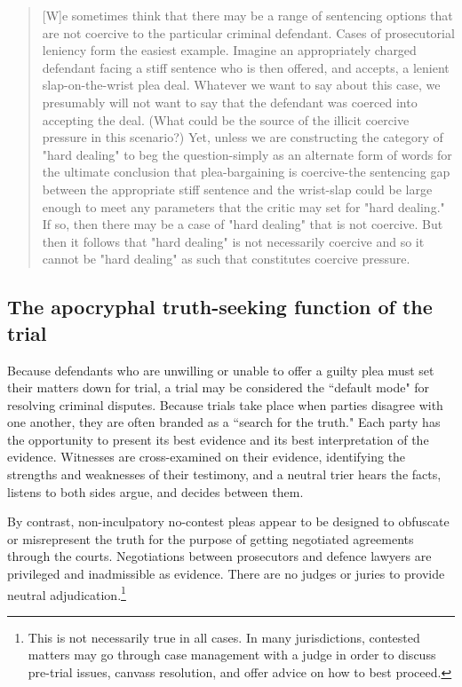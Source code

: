 \begin{quote}
    [W]e sometimes think that there may be a range of sentencing options that are not coercive to the particular criminal defendant. Cases of prosecutorial leniency form the easiest example. Imagine an appropriately charged defendant facing a stiff sentence who is then offered, and accepts, a lenient slap-on-the-wrist plea deal. Whatever we want to say about this case, we presumably will not want to say that the defendant was coerced into accepting the deal. (What could be the source of the illicit coercive pressure in this scenario?) Yet, unless we are constructing the category of "hard dealing" to beg the question-simply as an alternate form of words for the ultimate conclusion that plea-bargaining is coercive-the sentencing gap between the appropriate stiff sentence and the wrist-slap could be large enough to meet any parameters that the critic may set for "hard dealing." If so, then there may be a case of "hard dealing" that is not coercive. But then it follows that "hard dealing" is not necessarily coercive and so it cannot be "hard dealing" as such that constitutes coercive pressure.
\end{quote}


\subsection{The apocryphal truth-seeking function of the trial}

Because defendants who are unwilling or unable to offer a guilty plea must set their matters down for trial, a trial may be considered the ``default mode" for resolving criminal disputes. Because trials take place when parties disagree with one another, they are often branded as a ``search for the truth." Each party has the opportunity to present its best evidence and its best interpretation of the evidence. Witnesses are cross-examined on their evidence, identifying the strengths and weaknesses of their testimony, and a neutral trier hears the facts, listens to both sides argue, and decides between them.

By contrast, non-inculpatory no-contest pleas appear to be designed to obfuscate or misrepresent the truth for the purpose of getting negotiated agreements through the courts. Negotiations between prosecutors and defence lawyers are privileged and inadmissible as evidence. There are no judges or juries to provide neutral adjudication.\footnote{This is not necessarily true in all cases. In many jurisdictions, contested matters may go through case management with a judge in order to discuss pre-trial issues, canvass resolution, and offer advice on how to best proceed. }

